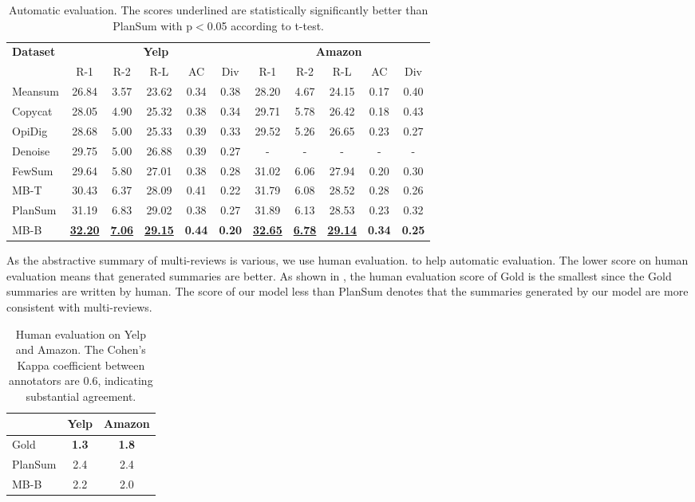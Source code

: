 \begin{table*}[th]
	\centering
	\small
	\begin{tabular}{|l|c|c|c|c|c|c|c|c|c|c|}
		\hline
		\multirow{2}{*}{\bf Dataset} & \multicolumn{5}{c|}{\bf Yelp} &  \multicolumn{5}{c|}{\bf Amazon} \\ \cline{2-11}
		& R-1 & R-2 & R-L& AC &Div & R-1 & R-2 & R-L& AC & Div\\
		\hline
		Meansum & 26.84 & 3.57 & 23.62 & 0.34 & 0.38 &  28.20 &4.67 & 24.15& 0.17& 0.40\\
		Copycat & 28.05& 4.90& 25.32& 0.38 & 0.34 & 29.71 & 5.78 & 26.42  & 0.18 & 0.43 \\
		OpiDig & 28.68 &5.00 & 25.33& 0.39 & 0.33 & 29.52 & 5.26 & 26.65 & 0.23 & 0.27 \\
		Denoise & 29.75 & 5.00 & 26.88 & 0.39 & 0.27 & - & - & - & - & - \\
		FewSum \tablefootnote{In our experiments, the summary is generated by FewSum without finetuned on human-annotated data, to be fair.} 
		& 29.64 & 5.80 & 27.01 & 0.38 & 0.28 & 31.02 & 6.06 & 27.94 & 0.20 & 0.30 \\
		MB-T & 30.43 & 6.37  & 28.09 &0.41 & 0.22 &31.79 &6.08 & 28.52 & 0.28 & 0.26 \\
		\hline
		PlanSum & 31.19&6.83 &29.02 & 0.38 & 0.27 & 31.89 &6.13 & 28.53 & 0.23 & 0.32\\
		MB-B & \underline{\bf 32.20} & \underline{\bf 7.06} & \underline{\bf 29.15} & \bf 0.44 & \bf 0.20 & \underline{\bf 32.65} & \underline{\bf 6.78} & \underline{\bf 29.14} & \bf 0.34 & \bf 0.25 \\
		\hline
	\end{tabular}
	\caption{Automatic evaluation. The scores underlined are statistically significantly better than PlanSum  with p$<$0.05 according to t-test.
	}\label{tab:all}  
\end{table*}


As the abstractive summary of multi-reviews is various,
we use human evaluation.
to help automatic evaluation.
The lower score on human evaluation means that generated summaries are better.
As shown in  , 
the human evaluation score of Gold is the smallest
since the Gold summaries are written by human.
The score of our model less than PlanSum
denotes that 
the summaries generated by our model 
are more consistent with multi-reviews.


\begin{table}[th]
	\centering
	\small
	\begin{tabular}{|l|c|c|}
		\hline 
		& Yelp & Amazon\\
		\hline
	   Gold & \bf{1.3} & \bf{1.8} \\
	   PlanSum & 2.4 & 2.4 \\
	   MB-B & 2.2 & 2.0 \\
	   \hline
	\end{tabular}
	\caption{Human evaluation on Yelp and Amazon. 
	The Cohen's Kappa coefficient between annotators are $0.6$, indicating substantial agreement.
	}\label{tab:human}  
\end{table}








